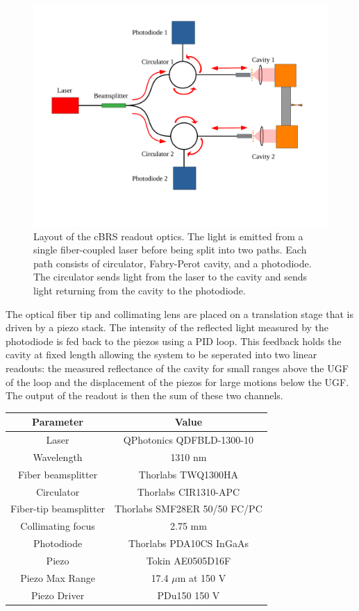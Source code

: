 \documentclass [12pt, proquest]{uwthesis}[2019]
\begin{document}
\begin{figure}[!h]
\begin{center}
\includegraphics[width=\textwidth]{cBRS_OpticalLayout.pdf}
\end{center}
\caption[Layout of the cBRS readout optics]{Layout of the cBRS readout optics. The light is emitted from a single fiber-coupled laser before being split into two paths. Each path consists of circulator, Fabry-Perot cavity, and a photodiode. The circulator sends light from the laser to the cavity and sends light returning from the cavity to the photodiode.}
\label{cBRSOptLay}
\end{figure}

The optical fiber tip and collimating lens are placed on a translation stage that is driven by a piezo stack. The intensity of the reflected light measured by the photodiode is fed back to the piezos using a PID loop. This feedback holds the cavity at fixed length allowing the system to be seperated into two linear readouts: the measured reflectance of the cavity for small ranges above the UGF of the loop and the displacement of the piezos for large motions below the UGF. The output of the readout is then the sum of these two channels.


\begin{center}
\begin{tabular}{| c | c |}
\hline
Parameter & Value\\
\hline \hline
Laser & QPhotonics QDFBLD-1300-10\\
Wavelength & 1310 nm\\
Fiber beamsplitter & Thorlabs TWQ1300HA\\
Circulator & Thorlabs CIR1310-APC\\
Fiber-tip beamsplitter & Thorlabs SMF28ER 50/50 FC/PC\\
Collimating focus & 2.75 mm\\
Photodiode & Thorlabs PDA10CS InGaAs\\
Piezo & Tokin AE0505D16F\\
Piezo Max Range & 17.4 $\mu$m at 150 V\\
Piezo Driver & PDu150 150 V\\
\hline
\end{tabular}
\label{cBRSTable}
\end{center}
\end{document}
